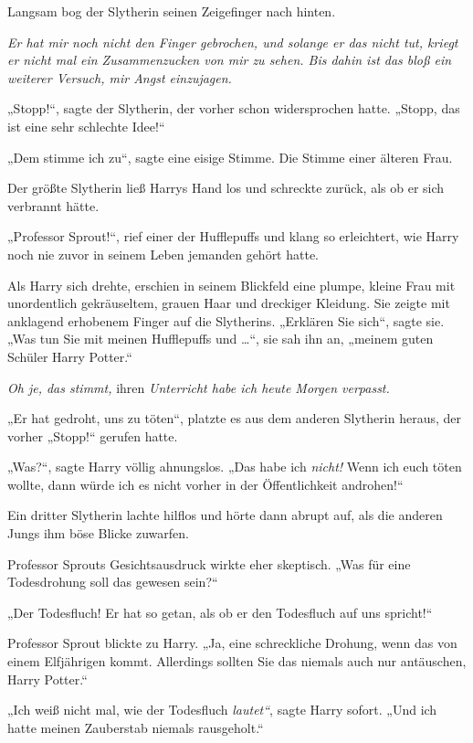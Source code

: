 Langsam bog der Slytherin seinen Zeigefinger nach hinten. 

\emph{Er hat mir noch nicht den Finger gebrochen, und solange er das nicht tut, kriegt er nicht mal ein Zusammenzucken von mir zu sehen. Bis dahin ist das bloß ein weiterer Versuch, mir Angst einzujagen.} 

„Stopp!“, sagte der Slytherin, der vorher schon widersprochen hatte. „Stopp, das ist eine sehr schlechte Idee!“ 

„Dem stimme ich zu“, sagte eine eisige Stimme. Die Stimme einer älteren Frau. 

Der größte Slytherin ließ Harrys Hand los und schreckte zurück, als ob er sich verbrannt hätte. 

„Professor Sprout!“, rief einer der Hufflepuffs und klang so erleichtert, wie Harry noch nie zuvor in seinem Leben jemanden gehört hatte. 

Als Harry sich drehte, erschien in seinem Blickfeld eine plumpe, kleine Frau mit unordentlich gekräuseltem, grauen Haar und dreckiger Kleidung. Sie zeigte mit anklagend erhobenem Finger auf die Slytherins. „Erklären Sie sich“, sagte sie. „Was tun Sie mit meinen Hufflepuffs und …“, sie sah ihn an, „meinem guten Schüler Harry Potter.“ 

\emph{Oh je, das stimmt, }ihren\emph{ Unterricht habe ich heute Morgen verpasst.} 

„Er hat gedroht, uns zu töten“, platzte es aus dem anderen Slytherin heraus, der vorher „Stopp!“ gerufen hatte. 

„Was?“, sagte Harry völlig ahnungslos. „Das habe ich \emph{nicht!} Wenn ich euch töten wollte, dann würde ich es nicht vorher in der Öffentlichkeit androhen!“ 

Ein dritter Slytherin lachte hilflos und hörte dann abrupt auf, als die anderen Jungs ihm böse Blicke zuwarfen. 

Professor Sprouts Gesichtsausdruck wirkte eher skeptisch. „Was für eine Todesdrohung soll das gewesen sein?“ 

„Der Todesfluch! Er hat so getan, als ob er den Todesfluch auf uns spricht!“ 

Professor Sprout blickte zu Harry. „Ja, eine schreckliche Drohung, wenn das von einem Elfjährigen kommt. Allerdings sollten Sie das niemals auch nur antäuschen, Harry Potter.“ 

„Ich weiß nicht mal, wie der Todesfluch \emph{lautet“}, sagte Harry sofort. „Und ich hatte meinen Zauberstab niemals rausgeholt.“ 

